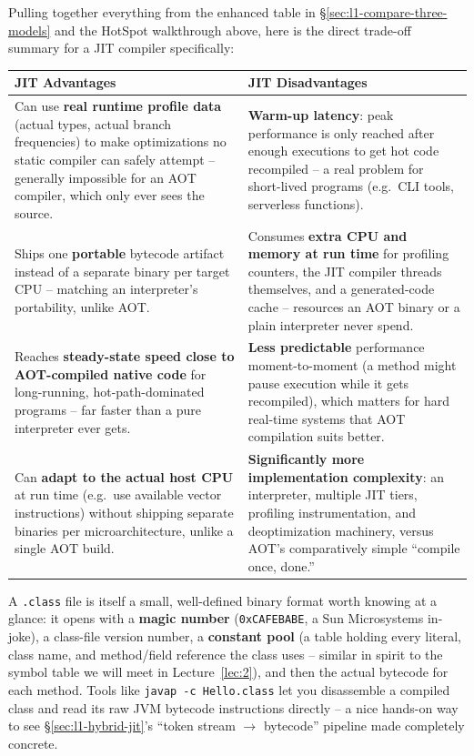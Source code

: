 \documentclass[full-course-notes.tex]{subfiles}
\begin{document}
Pulling together everything from the enhanced table in \S\ref{sec:l1-compare-three-models} and
the HotSpot walkthrough above, here is the direct trade-off summary for a JIT compiler
specifically:

\begin{center}
\renewcommand{\arraystretch}{1.3}
\begin{tabularx}{\textwidth}{@{}X X@{}}
\toprule
\textbf{JIT Advantages} & \textbf{JIT Disadvantages} \\
\midrule
Can use \textbf{real runtime profile data} (actual types, actual branch frequencies) to make
optimizations no static compiler can safely attempt -- generally impossible for an AOT compiler,
which only ever sees the source. &
\textbf{Warm-up latency}: peak performance is only reached after enough executions to get hot
code recompiled -- a real problem for short-lived programs (e.g.\ CLI tools, serverless
functions). \\
Ships one \textbf{portable} bytecode artifact instead of a separate binary per target CPU --
matching an interpreter's portability, unlike AOT. &
Consumes \textbf{extra CPU and memory at run time} for profiling counters, the JIT compiler
threads themselves, and a generated-code cache -- resources an AOT binary or a plain interpreter
never spend. \\
Reaches \textbf{steady-state speed close to AOT-compiled native code} for long-running,
hot-path-dominated programs -- far faster than a pure interpreter ever gets. &
\textbf{Less predictable} performance moment-to-moment (a method might pause execution while it
gets recompiled), which matters for hard real-time systems that AOT compilation suits better. \\
Can \textbf{adapt to the actual host CPU} at run time (e.g.\ use available vector instructions)
without shipping separate binaries per microarchitecture, unlike a single AOT build. &
\textbf{Significantly more implementation complexity}: an interpreter, multiple JIT tiers,
profiling instrumentation, and deoptimization machinery, versus AOT's comparatively simple
``compile once, done.'' \\
\bottomrule
\end{tabularx}
\end{center}

\begin{enrichment}
A \texttt{.class} file is itself a small, well-defined binary format worth knowing at a glance:
it opens with a \textbf{magic number} (\texttt{0xCAFEBABE}, a Sun Microsystems in-joke), a
class-file version number, a \textbf{constant pool} (a table holding every literal, class name,
and method/field reference the class uses -- similar in spirit to the symbol table we will meet
in Lecture~\ref{lec:2}), and then the actual bytecode for each method. Tools like \texttt{javap
-c Hello.class} let you disassemble a compiled class and read its raw JVM bytecode instructions
directly -- a nice hands-on way to see \S\ref{sec:l1-hybrid-jit}'s ``token stream $\to$
bytecode'' pipeline made completely concrete.
\end{enrichment}
\end{document}
